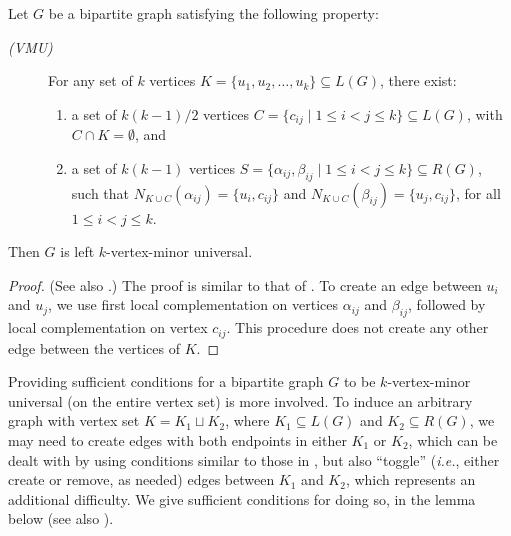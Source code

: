 \documentclass[a4paper,UKenglish,cleveref, autoref, thm-restate]{arxiv}
\newcommand{\ls}{\leqslant}
\begin{document}
\begin{lemma}\label{lemma:VMUcondition}
    Let $G$ be a bipartite graph satisfying the following property:
%
    \begin{description}
        \item[{\rm\em (VMU)}] For any set of $k$  vertices $K = \{u_1, u_2, \dots, u_k\} \subseteq L(G)$, there exist:
              \begin{enumerate}%
                  \item a set of $k(k-1)/2$  vertices $C = \{c_{ij} \mid 1 \ls i < j \ls k \} \subseteq L(G)$, with  $C\cap K = \emptyset$, and
                  \item a  set of $k(k-1)$  vertices $S = \{\alpha_{ij},\beta_{ij} \mid 1 \ls i < j \ls k \} \subseteq R(G)$, such that 
                   $N_{K \cup C} (\alpha_{ij}) = \{u_i, c_{ij}\}$ and $N_{K \cup C} (\beta_{ij}) = \{u_j, c_{ij}\}$, for all $1\ls i < j \ls k$.
              \end{enumerate}
    \end{description}
    Then $G$ is left $k$-vertex-minor universal.
\end{lemma}
\begin{proof}  
(See also .)
The proof is similar to that of . To create an edge between $u_i$ and $u_j$, we use  first local complementation on vertices $\alpha_{ij}$ and $\beta_{ij}$, followed by local complementation on vertex $c_{ij}$. This procedure does not create any other edge between the vertices of $K$. 
\end{proof}

Providing sufficient conditions for a bipartite graph $G$ to be $k$-vertex-minor universal (on the entire vertex set) is more involved. To induce an arbitrary graph with vertex set $K=K_1 \sqcup K_2$, where $K_1  \subseteq L(G)$ and $K_2\subseteq R(G)$, we may need to create  edges with both endpoints in either $K_1$ or  $K_2$, which can be dealt with by using conditions similar to those in , but also ``toggle'' (\emph{i.e.}, either create or remove, as needed)   edges between $K_1$ and $K_2$, which represents an additional difficulty. We give sufficient conditions for doing so, in the lemma below (see also ). 
\end{document}
